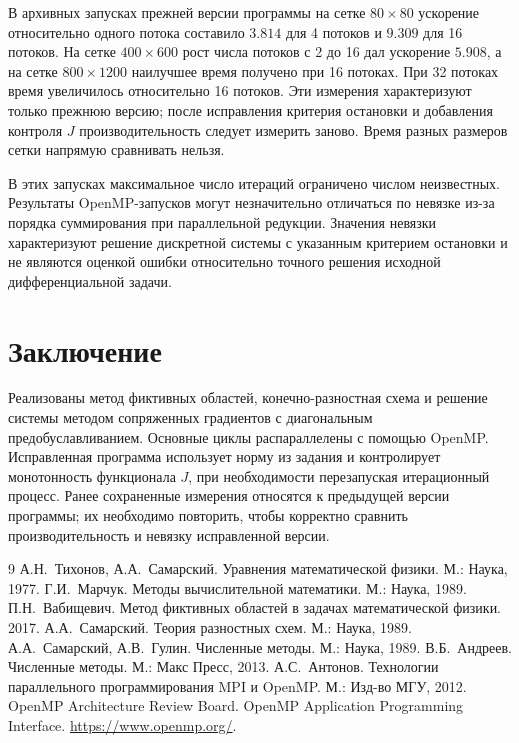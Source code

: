 \documentclass[12pt,a4paper]{article}
\begin{document}
В архивных запусках прежней версии программы на сетке \(80\times80\) ускорение относительно одного потока составило \(3.814\) для 4 потоков и \(9.309\) для 16 потоков. На сетке \(400\times600\) рост числа потоков с 2 до 16 дал ускорение \(5.908\), а на сетке \(800\times1200\) наилучшее время получено при 16 потоках. При 32 потоках время увеличилось относительно 16 потоков. Эти измерения характеризуют только прежнюю версию; после исправления критерия остановки и добавления контроля \(J\) производительность следует измерить заново. Время разных размеров сетки напрямую сравнивать нельзя.

В этих запусках максимальное число итераций ограничено числом неизвестных. Результаты OpenMP-запусков могут незначительно отличаться по невязке из-за порядка суммирования при параллельной редукции. Значения невязки характеризуют решение дискретной системы с указанным критерием остановки и не являются оценкой ошибки относительно точного решения исходной дифференциальной задачи.

\section{Заключение}

Реализованы метод фиктивных областей, конечно-разностная схема и решение системы методом сопряженных градиентов с диагональным предобуславливанием. Основные циклы распараллелены с помощью OpenMP. Исправленная программа использует норму из задания и контролирует монотонность функционала \(J\), при необходимости перезапуская итерационный процесс. Ранее сохраненные измерения относятся к предыдущей версии программы; их необходимо повторить, чтобы корректно сравнить производительность и невязку исправленной версии.

\begin{thebibliography}{9}
А.Н.~Тихонов, А.А.~Самарский. Уравнения математической физики. М.: Наука, 1977.
Г.И.~Марчук. Методы вычислительной математики. М.: Наука, 1989.
П.Н.~Вабищевич. Метод фиктивных областей в задачах математической физики. 2017.
А.А.~Самарский. Теория разностных схем. М.: Наука, 1989.
А.А.~Самарский, А.В.~Гулин. Численные методы. М.: Наука, 1989.
В.Б.~Андреев. Численные методы. М.: Макс Пресс, 2013.
А.С.~Антонов. Технологии параллельного программирования MPI и OpenMP. М.: Изд-во МГУ, 2012.
OpenMP Architecture Review Board. OpenMP Application Programming Interface. \url{https://www.openmp.org/}.
\end{thebibliography}
\end{document}
